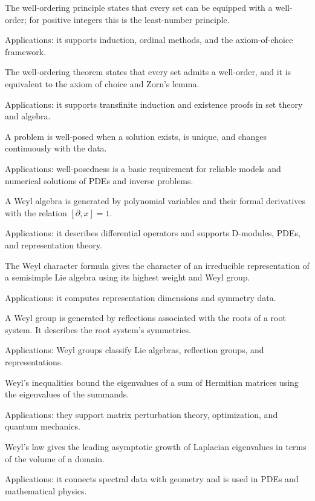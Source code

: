 The well-ordering principle states that every set can be equipped with a well-order; for positive integers this is the least-number principle. \par\noindent Applications: it supports induction, ordinal methods, and the axiom-of-choice framework.

The well-ordering theorem states that every set admits a well-order, and it is equivalent to the axiom of choice and Zorn's lemma. \par\noindent Applications: it supports transfinite induction and existence proofs in set theory and algebra.

A problem is well-posed when a solution exists, is unique, and changes continuously with the data. \par\noindent Applications: well-posedness is a basic requirement for reliable models and numerical solutions of PDEs and inverse problems.

A Weyl algebra is generated by polynomial variables and their formal derivatives with the relation $[\partial,x]=1$. \par\noindent Applications: it describes differential operators and supports D-modules, PDEs, and representation theory.

The Weyl character formula gives the character of an irreducible representation of a semisimple Lie algebra using its highest weight and Weyl group. \par\noindent Applications: it computes representation dimensions and symmetry data.

A Weyl group is generated by reflections associated with the roots of a root system. It describes the root system's symmetries. \par\noindent Applications: Weyl groups classify Lie algebras, reflection groups, and representations.

Weyl's inequalities bound the eigenvalues of a sum of Hermitian matrices using the eigenvalues of the summands. \par\noindent Applications: they support matrix perturbation theory, optimization, and quantum mechanics.

Weyl's law gives the leading asymptotic growth of Laplacian eigenvalues in terms of the volume of a domain. \par\noindent Applications: it connects spectral data with geometry and is used in PDEs and mathematical physics.

